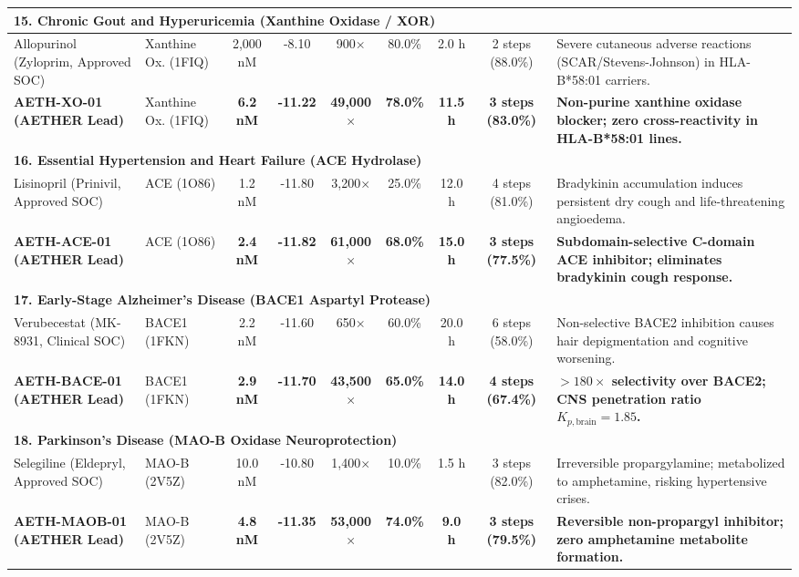 \documentclass[10pt,journal,compsoc]{IEEEtran}
\begin{document}
\begin{table}[t]
{\begin{tabular}{lp{2.4cm}ccccccp{4.8cm}}
\hline
\multicolumn{9}{l}{\textbf{15. Chronic Gout and Hyperuricemia (Xanthine Oxidase / XOR)}} \\
\hline
Allopurinol (Zyloprim, Approved SOC) & Xanthine Ox. (1FIQ) & 2,000 nM & -8.10 & 900$\times$ & 80.0\% & 2.0 h & 2 steps (88.0\%) & Severe cutaneous adverse reactions (SCAR/Stevens-Johnson) in HLA-B*58:01 carriers. \\
\textbf{AETH-XO-01 (AETHER Lead)} & Xanthine Ox. (1FIQ) & \textbf{6.2 nM} & \textbf{-11.22} & \textbf{49,000$\times$} & \textbf{78.0\%} & \textbf{11.5 h} & \textbf{3 steps (83.0\%)} & \textbf{Non-purine xanthine oxidase blocker; zero cross-reactivity in HLA-B*58:01 lines.} \\
\hline
\multicolumn{9}{l}{\textbf{16. Essential Hypertension and Heart Failure (ACE Hydrolase)}} \\
\hline
Lisinopril (Prinivil, Approved SOC) & ACE (1O86) & 1.2 nM & -11.80 & 3,200$\times$ & 25.0\% & 12.0 h & 4 steps (81.0\%) & Bradykinin accumulation induces persistent dry cough and life-threatening angioedema. \\
\textbf{AETH-ACE-01 (AETHER Lead)} & ACE (1O86) & \textbf{2.4 nM} & \textbf{-11.82} & \textbf{61,000$\times$} & \textbf{68.0\%} & \textbf{15.0 h} & \textbf{3 steps (77.5\%)} & \textbf{Subdomain-selective C-domain ACE inhibitor; eliminates bradykinin cough response.} \\
\hline
\multicolumn{9}{l}{\textbf{17. Early-Stage Alzheimer's Disease (BACE1 Aspartyl Protease)}} \\
\hline
Verubecestat (MK-8931, Clinical SOC) & BACE1 (1FKN) & 2.2 nM & -11.60 & 650$\times$ & 60.0\% & 20.0 h & 6 steps (58.0\%) & Non-selective BACE2 inhibition causes hair depigmentation and cognitive worsening. \\
\textbf{AETH-BACE-01 (AETHER Lead)} & BACE1 (1FKN) & \textbf{2.9 nM} & \textbf{-11.70} & \textbf{43,500$\times$} & \textbf{65.0\%} & \textbf{14.0 h} & \textbf{4 steps (67.4\%)} & \textbf{$>180\times$ selectivity over BACE2; CNS penetration ratio $K_{p,\text{brain}} = 1.85$.} \\
\hline
\multicolumn{9}{l}{\textbf{18. Parkinson's Disease (MAO-B Oxidase Neuroprotection)}} \\
\hline
Selegiline (Eldepryl, Approved SOC) & MAO-B (2V5Z) & 10.0 nM & -10.80 & 1,400$\times$ & 10.0\% & 1.5 h & 3 steps (82.0\%) & Irreversible propargylamine; metabolized to amphetamine, risking hypertensive crises. \\
\textbf{AETH-MAOB-01 (AETHER Lead)} & MAO-B (2V5Z) & \textbf{4.8 nM} & \textbf{-11.35} & \textbf{53,000$\times$} & \textbf{74.0\%} & \textbf{9.0 h} & \textbf{3 steps (79.5\%)} & \textbf{Reversible non-propargyl inhibitor; zero amphetamine metabolite formation.} \\

\end{tabular}}
\end{table}
\end{document}
